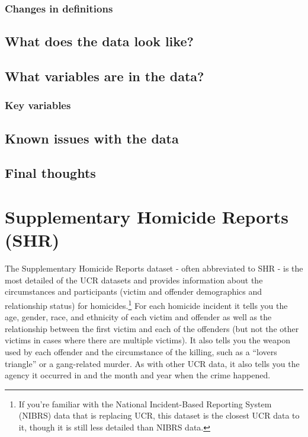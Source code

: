\documentclass[
  12pt,
  openany]{book}
\begin{document}
\hypertarget{changes-in-definitions-1}{%
\subsection{Changes in definitions}\label{changes-in-definitions-1}}

\hypertarget{what-does-the-data-look-like-1}{%
\section{What does the data look like?}\label{what-does-the-data-look-like-1}}

\hypertarget{what-variables-are-in-the-data-1}{%
\section{What variables are in the data?}\label{what-variables-are-in-the-data-1}}

\hypertarget{key-variables-1}{%
\subsection{Key variables}\label{key-variables-1}}

\hypertarget{known-issues-with-the-data-1}{%
\section{Known issues with the data}\label{known-issues-with-the-data-1}}

\hypertarget{final-thoughts-1}{%
\section{Final thoughts}\label{final-thoughts-1}}

\hypertarget{shr}{%
\chapter{Supplementary Homicide Reports (SHR)}\label{shr}}

The Supplementary Homicide Reports dataset - often abbreviated to SHR - is the most detailed of the UCR datasets and provides information about the circumstances and participants (victim and offender demographics and relationship status) for homicides.\footnote{If you're familiar with the National Incident-Based Reporting System (NIBRS) data that is replacing UCR, this dataset is the closest UCR data to it, though it is still less detailed than NIBRS data.} For each homicide incident it tells you the age, gender, race, and ethnicity of each victim and offender as well as the relationship between the first victim and each of the offenders (but not the other victims in cases where there are multiple victims). It also tells you the weapon used by each offender and the circumstance of the killing, such as a ``lovers triangle'' or a gang-related murder. As with other UCR data, it also tells you the agency it occurred in and the month and year when the crime happened.
\end{document}
